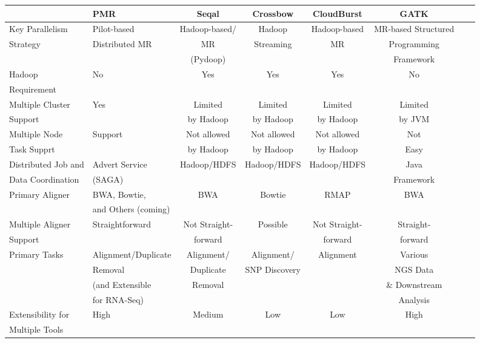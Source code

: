 \documentclass{acm_proc_article-sp}
\begin{document}
\begin{center}
\begin{table}[ht]
{\small
\hfill{}
\begin{tabular}{|l|l|c|c|c|c|c|c|}
\hline
  &\centering\textbf{PMR}\cite{pmr2012} & \textbf{Seqal}\cite{seal2011} & \textbf{Crossbow}\cite{langmead2009} & \textbf{CloudBurst}\cite{cloudburst} & \textbf{GATK}\cite{gatk} \\ \hline
 \hline 
 Key Parallelism   & Pilot-based   &  Hadoop-based/  &  Hadoop   & Hadoop-based & MR-based Structured \\ 
Strategy  & Distributed MR & MR  & Streaming  & MR & Programming  \\
& & (Pydoop) &  & & Framework \\ \hline
  
Hadoop & No & Yes & Yes\footnote[1] & Yes & No \\ 
Requirement  & & & &  &\\ \hline  
    
Multiple  Cluster & Yes  & Limited   & Limited  & Limited  & Limited \\
Support &  & by Hadoop &  by Hadoop & by Hadoop  & by JVM   \\ \hline

Multiple Node & Support & Not allowed  & Not allowed  & Not allowed & Not  \\
Task Supprt &  & by Hadoop & by Hadoop & by Hadoop & Easy  \\ \hline
Distributed Job and  & Advert Service  & Hadoop/HDFS & Hadoop/HDFS & Hadoop/HDFS & Java \\ 
Data Coordination &(SAGA) &  & & & Framework\\ \hline


Primary Aligner &  BWA, Bowtie,  &  BWA & Bowtie & RMAP &  BWA \\
& and Others (coming) &  &  &  &  \\ \hline
Multiple Aligner  & Straightforward & Not Straight- & Possible & Not Straight-  & Straight-  \\ 
Support &  & forward &   & forward  & forward \\\hline
Primary Tasks & Alignment/Duplicate  & Alignment/ & Alignment/ & Alignment &Various\\
  &  Removal & Duplicate & SNP Discovery & & NGS Data  \\  
           & (and Extensible &  Removal & &  & \& Downstream  \\
           & for RNA-Seq) & & &  & Analysis \\ \hline  
Extensibility for   &  High  & Medium &  Low & Low & High      \\
Multiple Tools  &      &  &  &  &   \\ \hline


\end{tabular}}
\end{table}
\end{center}
\end{document}
